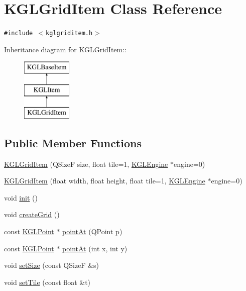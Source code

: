 \hypertarget{class_k_g_l_grid_item}{
\section{KGLGridItem Class Reference}
\label{class_k_g_l_grid_item}
}
{\tt \#include $<$kglgriditem.h$>$}

Inheritance diagram for KGLGridItem::\begin{figure}[H]
\begin{center}
\leavevmode
\includegraphics[height=3cm]{class_k_g_l_grid_item}
\end{center}
\end{figure}
\subsection*{Public Member Functions}
\begin{CompactItemize}
\item 
\hyperlink{class_k_g_l_grid_item_8016e40bc98d55adc2b08674d2fa117e}{KGLGridItem} (QSizeF size, float tile=1, \hyperlink{class_k_g_l_engine}{KGLEngine} $\ast$engine=0)
\item 
\hyperlink{class_k_g_l_grid_item_217588549e34d03495e0a883e3445c78}{KGLGridItem} (float width, float height, float tile=1, \hyperlink{class_k_g_l_engine}{KGLEngine} $\ast$engine=0)
\item 
void \hyperlink{class_k_g_l_grid_item_b86b8c2552de5956e79abb6b0ce81d73}{init} ()
\item 
void \hyperlink{class_k_g_l_grid_item_4e80ff451f8c95bc540751ed8f2b9a76}{createGrid} ()
\item 
const \hyperlink{class_k_g_l_point}{KGLPoint} $\ast$ \hyperlink{class_k_g_l_grid_item_8141076182d7926b8a303639783286af}{pointAt} (QPoint p)
\item 
const \hyperlink{class_k_g_l_point}{KGLPoint} $\ast$ \hyperlink{class_k_g_l_grid_item_dcacb054e43744cdadf266eb544d827c}{pointAt} (int x, int y)
\item 
void \hyperlink{class_k_g_l_grid_item_5f2a3cccf7cf2ad90bf40e822907c660}{setSize} (const QSizeF \&s)
\item 
void \hyperlink{class_k_g_l_grid_item_7ca4ae016b8d4af31cddeea0654584df}{setTile} (const float \&t)
\end{CompactItemize}


